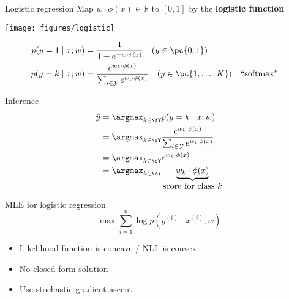 \documentclass[usenames,dvipsnames,notes,11pt,aspectratio=169]{beamer}
\newcommand{\pdfnote}[1]{}
\begin{document}
\begin{frame}
    {Logistic regression}
    Map $w\cdot\phi(x) \in\mathbb{R}$ to $[0,1]$ by the \textbf{logistic function}
    \vspace{-1em}
    \begin{center}
        \texttt{[image: figures/logistic]}
    \end{center}
    \vspace{-2em}
    \begin{align*}
    p(y=1\mid x; w) &= \frac{1}{1 + e^{-w\cdot\phi(x)}} \quad (y\in \pc{0,1})\\
        p(y=k\mid x; w) &= \frac{e^{w_k\cdot\phi(x)}}{\sum_{i\in\mathcal{Y}}e^{w_i\cdot\phi(x)}} \quad (y\in \pc{1, \ldots, K}) && \text{``softmax''}
    \end{align*}
    \pdfnote{
        Note that in multiclass classification setting, there is one $w$ for each class.
    }
\end{frame}

\begin{frame}
    {Inference}
    \begin{align}
        \hat{y} &= \argmax_{k\in\sY} p(y=k\mid x; w) \\
        &= \argmax_{k\in\sY} \frac{e^{w_k\cdot\phi(x)}}{\sum_{i\in\mathcal{Y}}e^{w_i\cdot\phi(x)}} \\
        &= \argmax_{k\in\sY} e^{w_k\cdot\phi(x)} \\
        &= \argmax_{k\in\sY} \underbrace{w_k\cdot\phi(x)}_{\textstyle\text{score for class $k$}}
    \end{align}
\end{frame}

\begin{frame}
    {MLE for logistic regression}
    $$
    \max \sum_{i=1}^n \log p(y^{(i)}\mid x^{(i)}; w) 
    $$
    \begin{itemize}
        \item Likelihood function is concave / NLL is convex
            \pause
        \item No closed-form solution 
        \item Use stochastic gradient ascent 
    \end{itemize}
    \pdfnote{LR is probabilistic, so we can still do MLE.}
    \pdfnote{Is there a closed form solution?}
\end{frame}
\end{document}
